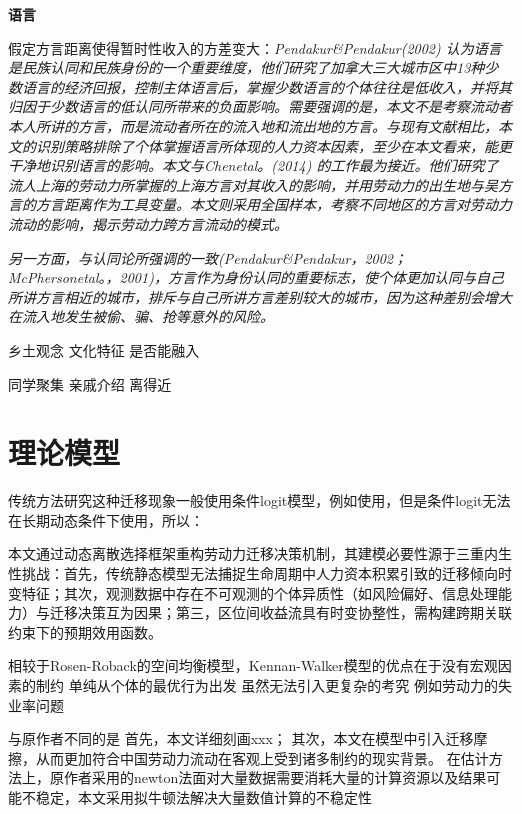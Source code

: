 \documentclass[a4paper,12pt]{article}
\begin{document}
\textbf{语言}

\cite{LiuYuYunLaoDongLiKuaFangYanLiuDongDeDaoUXingMoShi2015}假定方言距离使得暂时性收入的方差变大：\textit{Pendakur\&Pendakur(2002) 认为语言是民族认同和民族身份的一个重要维度，他们研究了加拿大三大城市区中13种少数语言的经济回报，控制主体语言后，掌握少数语言的个体往往是低收入，并将其归因于少数语言的低认同所带来的负面影响。需要强调的是，本文不是考察流动者本人所讲的方言，而是流动者所在的流入地和流出地的方言。与现有文献相比，本文的识别策略排除了个体掌握语言所体现的人力资本因素，至少在本文看来，能更干净地识别语言的影响。本文与Chenetal。(2014) 的工作最为接近。他们研究了流人上海的劳动力所掌握的上海方言对其收入的影响，并用劳动力的出生地与吴方言的方言距离作为工具变量。本文则采用全国样本，考察不同地区的方言对劳动力流动的影响，揭示劳动力跨方言流动的模式。}

\textit{另一方面，与认同论所强调的一致(Pendakur\&Pendakur，2002；McPhersonetal。，2001)，方言作为身份认同的重要标志，使个体更加认同与自己所讲方言相近的城市，排斥与自己所讲方言差别较大的城市，因为这种差别会增大在流入地发生被偷、骗、抢等意外的风险。}









乡土观念
文化特征
是否能融入

同学聚集
亲戚介绍
离得近


\section{理论模型}
传统方法研究这种迁移现象一般使用条件logit模型，例如\cite{SunWeiZengKongQiWuRanYuLaoDongLiDeKongJianLiuDongJiYuLiuDongRenKouJiuYeXuanZhiXingWeiDeYanJiu2019}使用，但是条件logit无法在长期动态条件下使用，所以：

本文通过动态离散选择框架重构劳动力迁移决策机制，其建模必要性源于三重内生性挑战：首先，传统静态模型无法捕捉生命周期中人力资本积累引致的迁移倾向时变特征；其次，观测数据中存在不可观测的个体异质性（如风险偏好、信息处理能力）与迁移决策互为因果；第三，区位间收益流具有时变协整性，需构建跨期关联约束下的预期效用函数。

相较于Rosen-Roback的空间均衡模型，Kennan-Walker模型的优点在于没有宏观因素的制约
单纯从个体的最优行为出发
虽然无法引入更复杂的考究 例如劳动力的失业率问题

与原作者不同的是
首先，本文详细刻画xxx；
其次，本文在模型中引入迁移摩擦，从而更加符合中国劳动力流动在客观上受到诸多制约的现实背景。
在估计方法上，原作者采用的newton法面对大量数据需要消耗大量的计算资源以及结果可能不稳定，本文采用拟牛顿法解决大量数值计算的不稳定性
\end{document}
